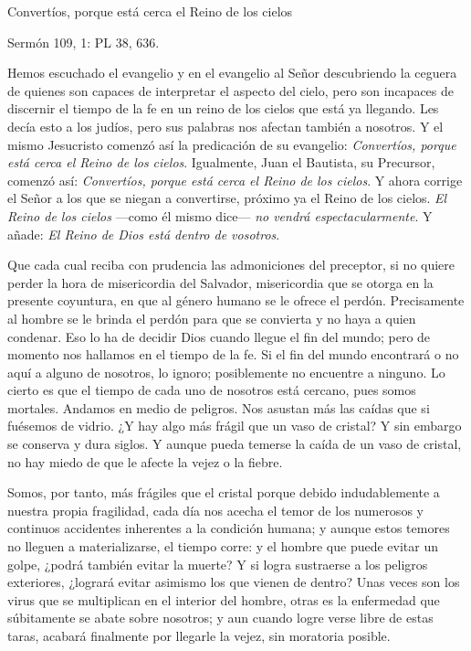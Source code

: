 Convertíos, porque está cerca el Reino de los cielos

Sermón 109, 1: PL 38, 636.

Hemos escuchado el evangelio y en el evangelio al Señor descubriendo la ceguera de quienes son capaces de interpretar el aspecto del cielo, pero son incapaces de discernir el tiempo de la fe en un reino de los cielos que está ya llegando. Les decía esto a los judíos, pero sus palabras nos afectan también a nosotros. Y el mismo Jesucristo comenzó así la predicación de su evangelio: \emph{Convertíos, porque está cerca el Reino de los cielos}. Igualmente, Juan el Bautista, su Precursor, comenzó así: \emph{Convertíos, porque está cerca el Reino de los cielos}. Y ahora corrige el Señor a los que se niegan a convertirse, próximo ya el Reino de los cielos. \emph{El Reino de los cielos} ---como él mismo dice--- \emph{no vendrá espectacularmente}. Y añade: \emph{El Reino de Dios está dentro de vosotros}.

Que cada cual reciba con prudencia las admoniciones del preceptor, si no quiere perder la hora de misericordia del Salvador, misericordia que se otorga en la presente coyuntura, en que al género humano se le ofrece el perdón. Precisamente al hombre se le brinda el perdón para que se convierta y no haya a quien condenar. Eso lo ha de decidir Dios cuando llegue el fin del mundo; pero de momento nos hallamos en el tiempo de la fe. Si el fin del mundo encontrará o no aquí a alguno de nosotros, lo ignoro; posiblemente no encuentre a ninguno. Lo cierto es que el tiempo de cada uno de nosotros está cercano, pues somos mortales. Andamos en medio de peligros. Nos asustan más las caídas que si fuésemos de vidrio. ¿Y hay algo más frágil que un vaso de cristal? Y sin embargo se conserva y dura siglos. Y aunque pueda temerse la caída de un vaso de cristal, no hay miedo de que le afecte la vejez o la fiebre.

Somos, por tanto, más frágiles que el cristal porque debido indudablemente a nuestra propia fragilidad, cada día nos acecha el temor de los numerosos y continuos accidentes inherentes a la condición humana; y aunque estos temores no lleguen a materializarse, el tiempo corre: y el hombre que puede evitar un golpe, ¿podrá también evitar la muerte? Y si logra sustraerse a los peligros exteriores, ¿logrará evitar asimismo los que vienen de dentro? Unas veces son los virus que se multiplican en el interior del hombre, otras es la enfermedad que súbitamente se abate sobre nosotros; y aun cuando logre verse libre de estas taras, acabará finalmente por llegarle la vejez, sin moratoria posible.

